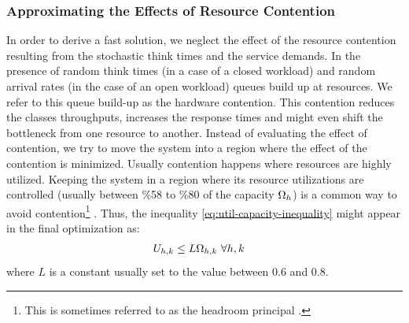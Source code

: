 \subsubsection{Approximating the Effects of Resource Contention} 
In order to derive a fast solution, we neglect the effect of the resource contention resulting from the stochastic think times and the service demands. 
In the presence of random think times (in a case of a closed workload) and random arrival rates (in the case of an open workload) queues build up at resources. We refer to this queue build-up as the hardware contention. This contention reduces the classes throughputs, increases the response times and might even shift the bottleneck from one resource to another. 
Instead of evaluating the effect of contention, we try to move the system into a region where the effect of the contention is minimized.
Usually contention happens where resources are highly utilized. Keeping the system in a region where its resource utilizations are controlled (usually between \%58 to \%80 of the capacity $\Omega_h$) is a common way to avoid contention\footnote{This is sometimes referred to as the headroom principal \cite{kalyvianaki_self-adaptive_2009}.} \cite{abdelzaher_performance_2002}.  
  Thus, the inequality \ref{eq:util-capacity-inequality} might appear in the final optimization as: 
\begin{align}
 U_{h,k} \le  L \Omega_{h,k}  & \  \forall h,k 
\end{align} 
where $L$ is a constant usually set to the value between 0.6 and 0.8. 

